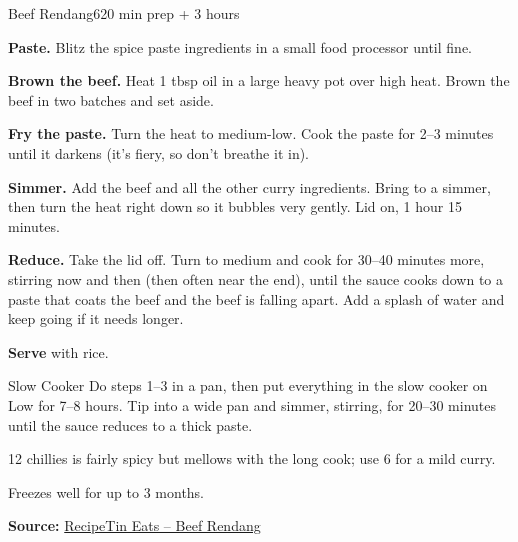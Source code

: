 \begin{recipebox}{Beef Rendang}{6}{20 min prep + 3 hours}
\begin{method}
  \item \textbf{Paste.} Blitz the spice paste ingredients in a small food processor
        until fine.
  \item \textbf{Brown the beef.} Heat 1 tbsp oil in a large heavy pot over high
        heat. Brown the beef in two batches and set aside.
  \item \textbf{Fry the paste.} Turn the heat to medium-low. Cook the paste for
        2--3 minutes until it darkens (it's fiery, so don't breathe it in).
  \item \textbf{Simmer.} Add the beef and all the other curry ingredients. Bring to
        a simmer, then turn the heat right down so it bubbles very gently. Lid on,
        1 hour 15 minutes.
  \item \textbf{Reduce.} Take the lid off. Turn to medium and cook for 30--40
        minutes more, stirring now and then (then often near the end), until the
        sauce cooks down to a paste that coats the beef and the beef is falling
        apart. Add a splash of water and keep going if it needs longer.
  \item \textbf{Serve} with rice.
\end{method}

\begin{variationbox}{Slow Cooker}
Do steps 1--3 in a pan, then put everything in the slow cooker on Low for
7--8 hours. Tip into a wide pan and simmer, stirring, for 20--30 minutes until
the sauce reduces to a thick paste.
\end{variationbox}

\begin{notelist}
  \item 12 chillies is fairly spicy but mellows with the long cook; use 6 for a
        mild curry.
  \item Freezes well for up to 3 months.
\end{notelist}

\noindent\textbf{Source:} \href{https://www.recipetineats.com/beef-rendang/}{RecipeTin Eats -- Beef Rendang}

\end{recipebox}
